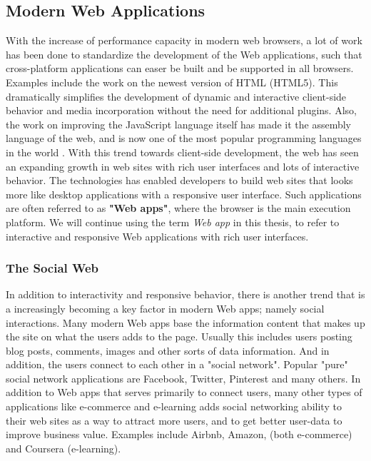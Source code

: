 \subsection{Modern Web Applications}
With the increase of performance capacity in modern web browsers, a lot of work has been done to standardize the development of the Web applications, such that cross-platform applications can easer be built and be supported in all browsers. Examples include the work on the newest version of HTML (HTML5). This dramatically simplifies the development of dynamic and interactive client-side behavior and media incorporation without the need for additional plugins. Also, the work on improving the JavaScript language itself has made it the assembly language of the web, and is now one of the most popular programming languages in the world \cite{jsPopularity}. With this trend towards client-side development, the web has seen an expanding growth in web sites with rich user interfaces and lots of interactive behavior. The technologies has enabled developers to build web sites that looks more like desktop applications with a responsive user interface. Such applications are often referred to as \textbf{"Web apps"}, where the browser is the main execution platform. We will continue using the term \textit{Web app} in this thesis, to refer to interactive and responsive Web applications with rich user interfaces.

\subsubsection{The Social Web}
In addition to interactivity and responsive behavior, there is another trend that is a increasingly becoming a key factor in modern Web apps; namely social interactions. Many modern Web apps base the information content that makes up the site on what the users adds to the page. Usually this includes users posting blog posts, comments, images and other sorts of data information. And in addition, the users connect to each other in a "social network". Popular "pure" social network applications are Facebook,\cite{face} Twitter,\cite{twitter} Pinterest \cite{pinterest} and many others. In addition to Web apps that serves primarily to connect users, many other types of applications like e-commerce and e-learning adds social networking ability to their web sites as a way to attract more users, and to get better user-data to improve business value. Examples include Airbnb,\cite{airbnb} Amazon,\cite{amazon} (both e-commerce) and Coursera (e-learning). \cite{coursera} 

